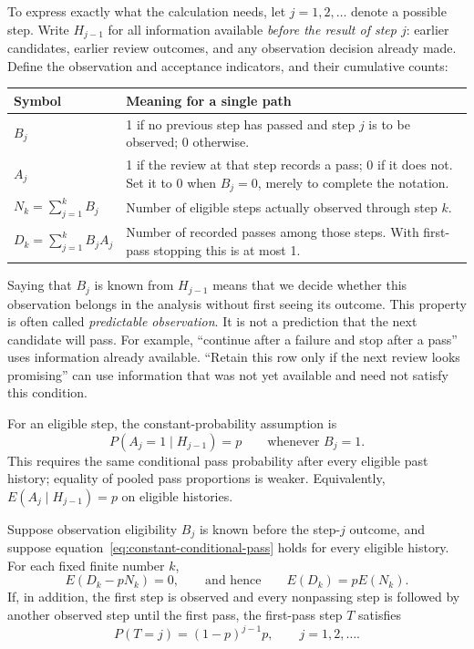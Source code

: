 To express exactly what the calculation needs, let $j=1,2,\ldots$ denote a possible step. Write $H_{j-1}$ for all information available \emph{before the result of step $j$}: earlier candidates, earlier review outcomes, and any observation decision already made. Define the observation and acceptance indicators, and their cumulative counts:
\begin{center}
\begin{tabularx}{\linewidth}{lY}
\toprule
Symbol & Meaning for a single path \\
\midrule
$B_j$ & 1 if no previous step has passed and step $j$ is to be observed; 0 otherwise. \\
$A_j$ & 1 if the review at that step records a pass; 0 if it does not. Set it to 0 when $B_j=0$, merely to complete the notation. \\
$N_k=\sum_{j=1}^k B_j$ & Number of eligible steps actually observed through step $k$. \\
$D_k=\sum_{j=1}^k B_jA_j$ & Number of recorded passes among those steps. With first-pass stopping this is at most 1. \\
\bottomrule
\end{tabularx}
\end{center}

Saying that $B_j$ is known from $H_{j-1}$ means that we decide whether this observation belongs in the analysis without first seeing its outcome. This property is often called \emph{predictable observation}. It is not a prediction that the next candidate will pass. For example, ``continue after a failure and stop after a pass'' uses information already available. ``Retain this row only if the next review looks promising'' can use information that was not yet available and need not satisfy this condition.

For an eligible step, the constant-probability assumption is
\begin{equation}
 P(A_j=1\mid H_{j-1})=p\qquad\text{whenever }B_j=1.
 \label{eq:constant-conditional-pass}
\end{equation}
This requires the same conditional pass probability after every eligible past history; equality of pooled pass proportions is weaker. Equivalently, $E(A_j\mid H_{j-1})=p$ on eligible histories.

\begin{proposition}
\label{prop:stopping}
Suppose observation eligibility $B_j$ is known before the step-$j$ outcome, and suppose equation~\eqref{eq:constant-conditional-pass} holds for every eligible history. For each fixed finite number $k$,
\begin{equation}
 E(D_k-pN_k)=0,\qquad\text{and hence}\qquad E(D_k)=pE(N_k).
 \label{eq:stopped-count-identity}
\end{equation}
If, in addition, the first step is observed and every nonpassing step is followed by another observed step until the first pass, the first-pass step $T$ satisfies
\begin{equation}
 P(T=j)=(1-p)^{j-1}p,\qquad j=1,2,\ldots.
 \label{eq:geometric-pass}
\end{equation}
\end{proposition}

